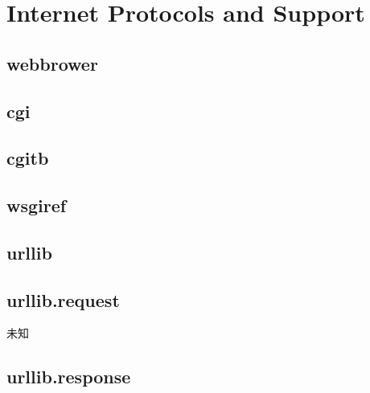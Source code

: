 \chapter{Internet Protocols and Support}
\section{webbrower}






\section{cgi}






\section{cgitb}






\section{wsgiref}






\section{urllib}





\section{urllib.request}
\noindent{\color{red}{urllib.request.urlopen(url, data=None, [timeout,]*, cafile=None, cadefault=False, context=None):}}
\par{未知}\\







\section{urllib.response}





